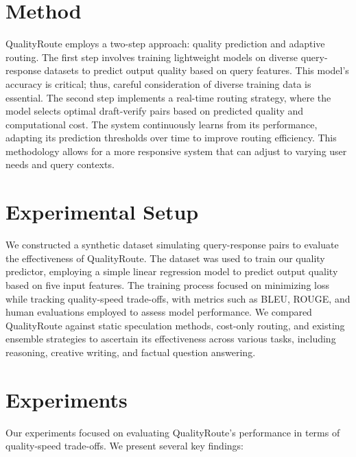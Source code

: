 \documentclass{article} %
\begin{document}
\section{Method}
QualityRoute employs a two-step approach: quality prediction and adaptive routing. The first step involves training lightweight models on diverse query-response datasets to predict output quality based on query features. This model's accuracy is critical; thus, careful consideration of diverse training data is essential. The second step implements a real-time routing strategy, where the model selects optimal draft-verify pairs based on predicted quality and computational cost. The system continuously learns from its performance, adapting its prediction thresholds over time to improve routing efficiency. This methodology allows for a more responsive system that can adjust to varying user needs and query contexts.

\section{Experimental Setup}
We constructed a synthetic dataset simulating query-response pairs to evaluate the effectiveness of QualityRoute. The dataset was used to train our quality predictor, employing a simple linear regression model to predict output quality based on five input features. The training process focused on minimizing loss while tracking quality-speed trade-offs, with metrics such as BLEU, ROUGE, and human evaluations employed to assess model performance. We compared QualityRoute against static speculation methods, cost-only routing, and existing ensemble strategies to ascertain its effectiveness across various tasks, including reasoning, creative writing, and factual question answering.

\section{Experiments}
Our experiments focused on evaluating QualityRoute's performance in terms of quality-speed trade-offs. We present several key findings:
\end{document}
